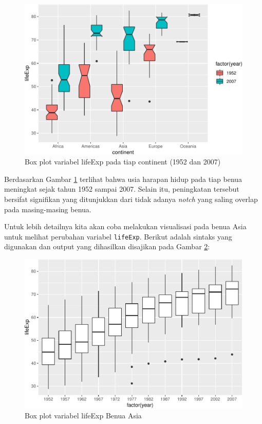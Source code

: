 \documentclass[]{book}
\newenvironment{Shaded}{\begin{snugshade}}{\end{snugshade}}
\newcommand{\KeywordTok}[1]{\textcolor[rgb]{0.13,0.29,0.53}{\textbf{#1}}}
\newcommand{\StringTok}[1]{\textcolor[rgb]{0.31,0.60,0.02}{#1}}
\newcommand{\OperatorTok}[1]{\textcolor[rgb]{0.81,0.36,0.00}{\textbf{#1}}}
\newcommand{\NormalTok}[1]{#1}
\begin{document}
\begin{figure}

{\centering \includegraphics[width=0.7\linewidth]{EnvStat_files/figure-latex/ggboxplot3-1} 

}

\caption{Box plot variabel lifeExp pada tiap continent (1952 dan 2007)}\label{fig:ggboxplot3}
\end{figure}

Berdasarkan Gambar \ref{fig:ggboxplot3} terlihat bahwa usia harapan
hidup pada tiap benua meningkat sejak tahun 1952 sampai 2007. Selain
itu, peningkatan tersebut bersifat signifikan yang ditunjukkan dari
tidak adanya \emph{notch} yang saling overlap pada masing-masing benua.

Untuk lebih detailnya kita akan coba melakukan visualisasi pada benua
Asia untuk melihat perubahan variabel \texttt{lifeExp}. Berikut adalah
sintaks yang digunakan dan output yang dihasilkan disajikan pada Gambar
\ref{fig:ggboxplot4}:

\begin{Shaded}
\end{Shaded}

\begin{figure}

{\centering \includegraphics[width=0.7\linewidth]{EnvStat_files/figure-latex/ggboxplot4-1} 

}

\caption{Box plot variabel lifeExp Benua Asia}\label{fig:ggboxplot4}
\end{figure}
\end{document}
